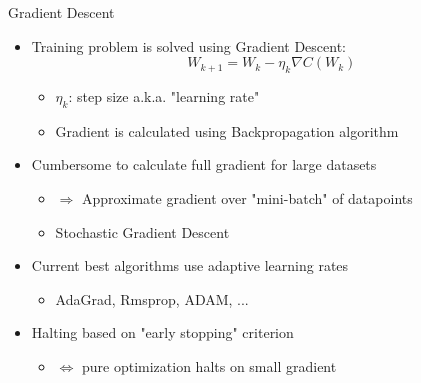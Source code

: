 \documentclass[11pt,t]{beamer}
\begin{document}
\begin{frame}[fragile]{Gradient Descent}
	\begin{itemize}
		\item Training problem is solved using Gradient Descent:
      	\begin{equation*}
      		W_{k+1} = W_{k} - \eta_k\nabla C(W_k)
      	\end{equation*}
      	\begin{itemize}
      	\item $\eta_k$: step size a.k.a. "learning rate"
      	\item Gradient is calculated using Backpropagation algorithm
      	\end{itemize}
      	\item Cumbersome to calculate full gradient for large datasets
      	\begin{itemize}
      	\item $\Rightarrow$ Approximate gradient over "mini-batch" of datapoints
      	\item Stochastic Gradient Descent
      	\end{itemize}
      	\item Current best algorithms use adaptive learning rates
      	\begin{itemize}
      		\item AdaGrad, Rmsprop, ADAM, ...
      	\end{itemize}
      	\item Halting based on "early stopping" criterion
      	\begin{itemize}
      		\item $\Leftrightarrow$ pure optimization halts on small gradient 
      	\end{itemize}
      	
	
	\end{itemize}
\end{frame}
\end{document}
